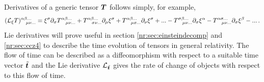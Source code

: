 Derivatives of a generic tensor $\boldsymbol{T}$ follows simply, for example,
\begin{equation}(\mathcal{L}_\xi T )^{\alpha\beta ...}_{\,\,\,\,\,\,\mu\nu...} = \xi^\sigma \partial_\sigma T^{\alpha\beta ...}_{\,\,\,\,\,\,\mu\nu...} + T^{\alpha\beta ...}_{\,\,\,\,\,\,\sigma\nu...} \partial_\mu \xi^\sigma + T^{\alpha\beta ...}_{\,\,\,\,\,\,\mu\sigma...} \partial_\nu \xi^\sigma + ... - T^{\sigma\beta ...}_{\,\,\,\,\,\,\mu\nu...}\partial_\sigma \xi^\alpha - T^{\alpha\sigma ...}_{\,\,\,\,\,\,\mu\nu...}\partial_\sigma \xi^\beta - ...\,.
\end{equation} 
Lie derivatives will prove useful in section \ref{nr:sec:einsteindecomp} and \ref{nr:sec:ccz4} to describe the time evolution of tensors in general relativity. The flow of time can be described as a diffeomorphism with respect to a suitable time vector $\tilde{\boldsymbol{t}}$ and the Lie derivative $\mathcal{L}_{\tilde{\boldsymbol{t}}}$ gives the rate of change of objects with respect to this flow of time.





